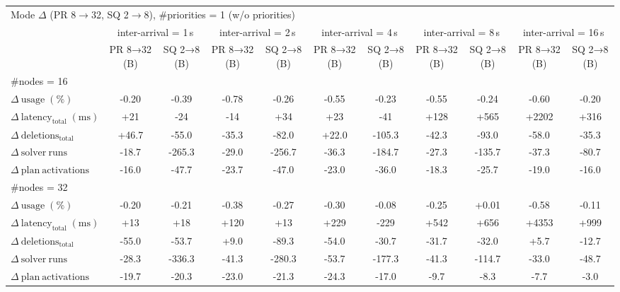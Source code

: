 
\begin{tabular}{l c c c c c c c c c c}
\toprule
\multicolumn{11}{l}{Mode $\Delta$ (PR 8$\rightarrow$32, SQ 2$\rightarrow$8), \#priorities = 1 (w/o priorities)} \\
\addlinespace[0.2em]
 & \multicolumn{2}{c}{inter-arrival = 1\,s} & \multicolumn{2}{c}{inter-arrival = 2\,s} & \multicolumn{2}{c}{inter-arrival = 4\,s} & \multicolumn{2}{c}{inter-arrival = 8\,s} & \multicolumn{2}{c}{inter-arrival = 16\,s} \\
\cmidrule(lr){2-3}\cmidrule(lr){4-5}\cmidrule(lr){6-7}\cmidrule(lr){8-9}\cmidrule(lr){10-11}
 & PR 8→32 (B) & SQ 2→8 (B) & PR 8→32 (B) & SQ 2→8 (B) & PR 8→32 (B) & SQ 2→8 (B) & PR 8→32 (B) & SQ 2→8 (B) & PR 8→32 (B) & SQ 2→8 (B) \\
\midrule
\multicolumn{11}{l}{\#nodes = 16} \\
\midrule
$\Delta\ \mathrm{usage}\;(\%)$ & -0.20 & -0.39 & -0.78 & -0.26 & -0.55 & -0.23 & -0.55 & -0.24 & -0.60 & -0.20 \\
$\Delta\ \mathrm{latency}_{\mathrm{total}}\;(\mathrm{ms})$ & +21 & -24 & -14 & +34 & +23 & -41 & +128 & +565 & +2202 & +316 \\
$\Delta\ \mathrm{deletions}_{\mathrm{total}}$ & +46.7 & -55.0 & -35.3 & -82.0 & +22.0 & -105.3 & -42.3 & -93.0 & -58.0 & -35.3 \\
$\Delta\ \mathrm{solver\ runs}$ & -18.7 & -265.3 & -29.0 & -256.7 & -36.3 & -184.7 & -27.3 & -135.7 & -37.3 & -80.7 \\
$\Delta\ \mathrm{plan\ activations}$ & -16.0 & -47.7 & -23.7 & -47.0 & -23.0 & -36.0 & -18.3 & -25.7 & -19.0 & -16.0 \\
\midrule
\multicolumn{11}{l}{\#nodes = 32} \\
\midrule
$\Delta\ \mathrm{usage}\;(\%)$ & -0.20 & -0.21 & -0.38 & -0.27 & -0.30 & -0.08 & -0.25 & +0.01 & -0.58 & -0.11 \\
$\Delta\ \mathrm{latency}_{\mathrm{total}}\;(\mathrm{ms})$ & +13 & +18 & +120 & +13 & +229 & -229 & +542 & +656 & +4353 & +999 \\
$\Delta\ \mathrm{deletions}_{\mathrm{total}}$ & -55.0 & -53.7 & +9.0 & -89.3 & -54.0 & -30.7 & -31.7 & -32.0 & +5.7 & -12.7 \\
$\Delta\ \mathrm{solver\ runs}$ & -28.3 & -336.3 & -41.3 & -280.3 & -53.7 & -177.3 & -41.3 & -114.7 & -33.0 & -48.7 \\
$\Delta\ \mathrm{plan\ activations}$ & -19.7 & -20.3 & -23.0 & -21.3 & -24.3 & -17.0 & -9.7 & -8.3 & -7.7 & -3.0 \\
\bottomrule
\end{tabular}


